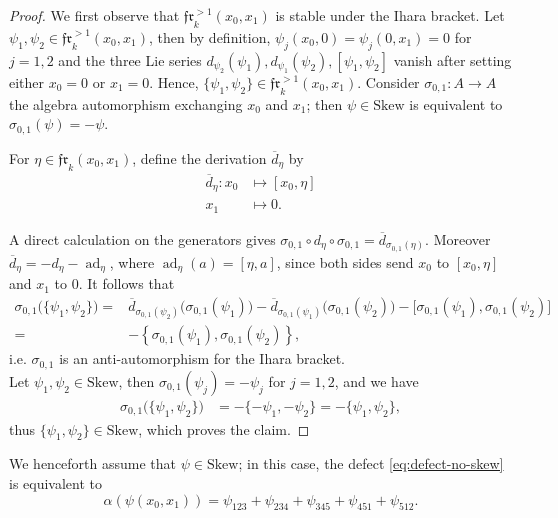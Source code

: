 \documentclass[a4paper,fleqn]{cas-sc}
\newcommand{\frone}{\mathfrak{fr}^{>1}_k(x_0,x_1)}
\begin{document}
\begin{proof}
We first observe that $\frone$ is stable under the Ihara bracket. 
Let \(\psi_1,\psi_2\in\mathfrak{fr}^{>1}_k(x_0,x_1)\), then by definition, $\psi_j(x_0,0)=\psi_j(0,x_1)=0$ for $j=1,2$ and
the three Lie series $d_{\psi_2}(\psi_1), d_{\psi_1}(\psi_2),
[\psi_1,\psi_2]$ vanish after setting either \(x_0=0\) or \(x_1=0\). Hence, $\{\psi_1,\psi_2\}\in \frone$. Consider $\sigma_{0,1}:A\to A$ the algebra automorphism exchanging \(x_0\) and \(x_1\);
then $\psi\in\mathrm{Skew}$ is equivalent to $\sigma_{0,1}(\psi)=-\psi.$

For \(\eta\in\mathfrak{fr}_k(x_0,x_1)\), define the derivation
\(\overline d_\eta\) by 
\begin{align*}
    \overline d_\eta: x_0 & \mapsto [x_0,\eta] \\
                        x_1 & \mapsto 0.
\end{align*}

A direct calculation on the generators gives $\sigma_{0,1}\circ d_\eta\circ\sigma_{0,1}
= \overline d_{\sigma_{0,1}(\eta)}$. Moreover
$\overline d_\eta=-d_\eta-\operatorname{ad}_\eta$, where
\(\operatorname{ad}_\eta(a)=[\eta,a]\), since both sides send \(x_0\) to \([x_0,\eta]\) and \(x_1\) to \(0\). It follows that
\begin{align*}
\sigma_{0,1}\bigl(\{\psi_1,\psi_2\}\bigr)
={}&
\overline d_{\sigma_{0,1}(\psi_2)}
   \bigl(\sigma_{0,1}(\psi_1)\bigr)
-
\overline d_{\sigma_{0,1}(\psi_1)}
   \bigl(\sigma_{0,1}(\psi_2)\bigr) 
-
\bigl[
\sigma_{0,1}(\psi_1),
\sigma_{0,1}(\psi_2)
\bigr]                                                    \\
={}&
-\left\{
\sigma_{0,1}(\psi_1),
\sigma_{0,1}(\psi_2)
\right\},
\end{align*}
i.e. \(\sigma_{0,1}\) is an anti-automorphism for the Ihara bracket. \\

Let \(\psi_1,\psi_2\in\mathrm{Skew}\), then
$\sigma_{0,1}(\psi_j)=-\psi_j$ for $j=1,2$, and we have
\[
\begin{aligned}
\sigma_{0,1}\bigl(\{\psi_1,\psi_2\}\bigr)
&=-\{-\psi_1,-\psi_2\} =-\{\psi_1,\psi_2\},
\end{aligned}
\]
thus
\(\{\psi_1,\psi_2\}\in\mathrm{Skew}\), which proves the
claim.
\end{proof}


We henceforth assume that $\psi \in \mathrm{Skew}$; in this case, the defect \eqref{eq:defect-no-skew} is equivalent to
$$
\alpha\left(\psi(x_0,x_1)\right)
=\psi_{123}+\psi_{234}+\psi_{345}+\psi_{451}+\psi_{512}.
$$
\end{document}
